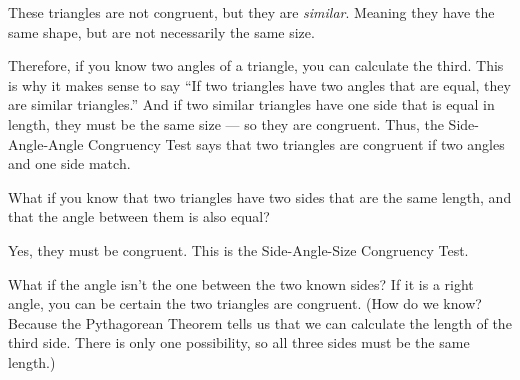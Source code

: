 These triangles are not congruent, but they are \emph{similar}. Meaning
 they have the same shape, but are not necessarily the same
size.

Therefore, if you know two angles of a triangle, you can calculate the third. This is why it makes sense
to say ``If two triangles have two angles that are equal, they are
similar triangles.''  And if two similar triangles have one side that
is equal in length, they must be the same size --- so they are
congruent. Thus, the Side-Angle-Angle Congruency Test says that
two triangles are congruent if two angles and one side match.

What if you know that two triangles have two sides that are the same
length, and that the angle between them is also equal?


Yes, they must be congruent. This is the Side-Angle-Size Congruency Test.

What if the angle isn't the one between the two known sides? If it is
a right angle, you can be certain the two triangles are congruent.
(How do we know? Because the Pythagorean Theorem tells us that we can
calculate the length of the third side. There is only one possibility,
so all three sides must be the same length.)

